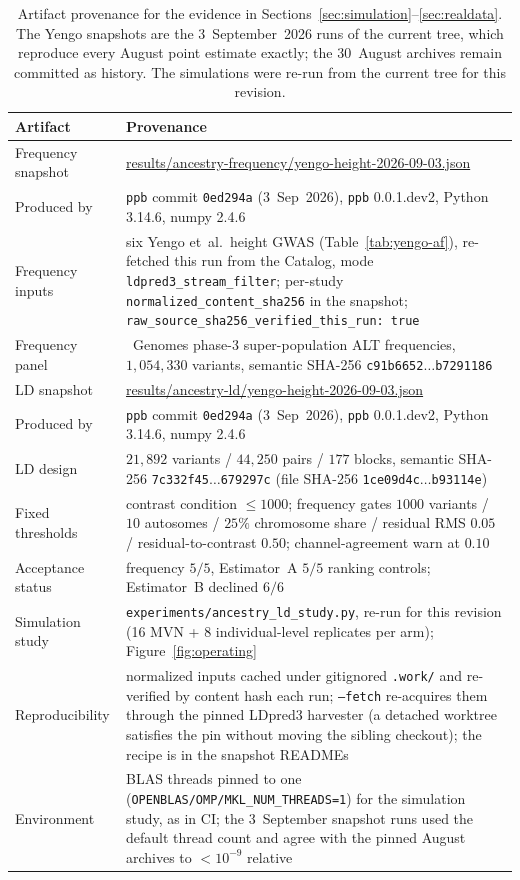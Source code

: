 \documentclass[11pt,a4paper]{article}
\begin{document}
\begin{table}[htbp]
\centering
\small
\caption{Artifact provenance for the evidence in
Sections~\ref{sec:simulation}--\ref{sec:realdata}. The Yengo snapshots
are the 3~September~2026 runs of the current tree, which reproduce every
August point estimate exactly; the 30~August archives remain committed
as history. The simulations were re-run from the current tree for this
revision.}
\label{tab:provenance}
\begin{tabularx}{\textwidth}{@{}l >{\raggedright\arraybackslash}X@{}}
\toprule
Artifact & Provenance \\
\midrule
Frequency snapshot &
\url{results/ancestry-frequency/yengo-height-2026-09-03.json} \\
Produced by & \texttt{ppb} commit \texttt{0ed294a} (3~Sep~2026),
\texttt{ppb} 0.0.1.dev2, Python 3.14.6, numpy 2.4.6 \\
Frequency inputs & six Yengo et~al.\ height GWAS (Table~\ref{tab:yengo-af}),
re-fetched this run from the Catalog, mode
\texttt{ldpred3\_stream\_filter}; per-study
\texttt{normalized\_content\_sha256} in the snapshot;
\texttt{raw\_source\_sha256\_verified\_this\_run: true} \\
Frequency panel & 1000~Genomes phase-3 super-population ALT frequencies,
$1{,}054{,}330$ variants,
semantic SHA-256 \texttt{c91b6652$\ldots$b7291186} \\
LD snapshot &
\url{results/ancestry-ld/yengo-height-2026-09-03.json} \\
Produced by & \texttt{ppb} commit \texttt{0ed294a} (3~Sep~2026),
\texttt{ppb} 0.0.1.dev2, Python 3.14.6, numpy 2.4.6 \\
LD design & $21{,}892$ variants / $44{,}250$ pairs / $177$ blocks,
semantic SHA-256 \texttt{7c332f45$\ldots$679297c}
(file SHA-256 \texttt{1ce09d4c$\ldots$b93114e}) \\
Fixed thresholds & contrast condition $\le 1000$; frequency gates
$1000$ variants / $10$ autosomes / $25\%$ chromosome share /
residual RMS $0.05$ / residual-to-contrast $0.50$;
channel-agreement warn at $0.10$ \\
Acceptance status & frequency $5/5$, Estimator~A $5/5$ ranking controls;
Estimator~B declined $6/6$ \\
Simulation study & \texttt{experiments/ancestry\_ld\_study.py},
re-run for this revision (16 MVN + 8 individual-level replicates per
arm); Figure~\ref{fig:operating} \\
Reproducibility & normalized inputs cached under gitignored
\texttt{.work/} and re-verified by content hash each run; \texttt{--fetch}
re-acquires them through the pinned LDpred3 harvester (a detached
worktree satisfies the pin without moving the sibling checkout);
the recipe is in the snapshot READMEs \\
Environment & BLAS threads pinned to one
(\texttt{OPENBLAS/OMP/MKL\_NUM\_THREADS=1}) for the simulation study,
as in CI; the 3~September snapshot runs used the default thread count
and agree with the pinned August archives to $<10^{-9}$ relative \\
\bottomrule
\end{tabularx}
\end{table}
\end{document}
